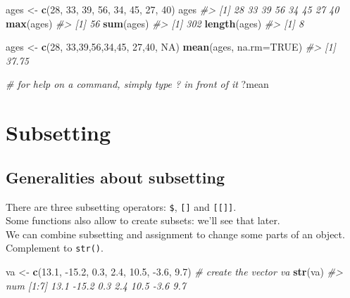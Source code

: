 \documentclass[]{book}
\newenvironment{Shaded}{}{}
\newcommand{\CommentTok}[1]{\textcolor[rgb]{0.38,0.63,0.69}{\textit{#1}}}
\newcommand{\DataTypeTok}[1]{\textcolor[rgb]{0.56,0.13,0.00}{#1}}
\newcommand{\DecValTok}[1]{\textcolor[rgb]{0.25,0.63,0.44}{#1}}
\newcommand{\FloatTok}[1]{\textcolor[rgb]{0.25,0.63,0.44}{#1}}
\newcommand{\KeywordTok}[1]{\textcolor[rgb]{0.00,0.44,0.13}{\textbf{#1}}}
\newcommand{\NormalTok}[1]{#1}
\newcommand{\OtherTok}[1]{\textcolor[rgb]{0.00,0.44,0.13}{#1}}
\newcommand{\StringTok}[1]{\textcolor[rgb]{0.25,0.44,0.63}{#1}}
\theoremstyle{definition}
\theoremstyle{definition}
\theoremstyle{definition}
\theoremstyle{remark}
\begin{document}
\begin{Shaded}
\begin{Highlighting}[]
\NormalTok{ages <-}\StringTok{ }\KeywordTok{c}\NormalTok{(}\DecValTok{28}\NormalTok{, }\DecValTok{33}\NormalTok{, }\DecValTok{39}\NormalTok{, }\DecValTok{56}\NormalTok{, }\DecValTok{34}\NormalTok{, }\DecValTok{45}\NormalTok{, }\DecValTok{27}\NormalTok{, }\DecValTok{40}\NormalTok{)}
\NormalTok{ages}
\CommentTok{#> [1] 28 33 39 56 34 45 27 40}
\KeywordTok{max}\NormalTok{(ages)}
\CommentTok{#> [1] 56}
\KeywordTok{sum}\NormalTok{(ages)}
\CommentTok{#> [1] 302}
\KeywordTok{length}\NormalTok{(ages)}
\CommentTok{#> [1] 8}

\NormalTok{ages <-}\StringTok{ }\KeywordTok{c}\NormalTok{(}\DecValTok{28}\NormalTok{, }\DecValTok{33}\NormalTok{,}\DecValTok{39}\NormalTok{,}\DecValTok{56}\NormalTok{,}\DecValTok{34}\NormalTok{,}\DecValTok{45}\NormalTok{, }\DecValTok{27}\NormalTok{,}\DecValTok{40}\NormalTok{, }\OtherTok{NA}\NormalTok{)}
\KeywordTok{mean}\NormalTok{(ages, }\DataTypeTok{na.rm=}\OtherTok{TRUE}\NormalTok{)}
\CommentTok{#> [1] 37.75}

\CommentTok{# for help on a command, simply type ? in front of it}
\NormalTok{?mean}
\end{Highlighting}
\end{Shaded}

\hypertarget{subset}{%
\chapter{Subsetting}\label{subset}}

\hypertarget{generalities-about-subsetting}{%
\section{Generalities about
subsetting}\label{generalities-about-subsetting}}

There are three subsetting operators: \texttt{\$}, \texttt{{[}{]}} and
\texttt{{[}{[}{]}{]}}.\\
Some functions also allow to create subsets: we'll see that later.\\
We can combine subsetting and assignment to change some parts of an
object.\\
Complement to \texttt{str()}.

\begin{Shaded}
\begin{Highlighting}[]
\NormalTok{va <-}\StringTok{ }\KeywordTok{c}\NormalTok{(}\FloatTok{13.1}\NormalTok{, }\FloatTok{-15.2}\NormalTok{, }\FloatTok{0.3}\NormalTok{, }\FloatTok{2.4}\NormalTok{, }\FloatTok{10.5}\NormalTok{, }\FloatTok{-3.6}\NormalTok{, }\FloatTok{9.7}\NormalTok{) }\CommentTok{# create the vector va}
\KeywordTok{str}\NormalTok{(va)}
\CommentTok{#>  num [1:7] 13.1 -15.2 0.3 2.4 10.5 -3.6 9.7}
\end{Highlighting}
\end{Shaded}
\end{document}
